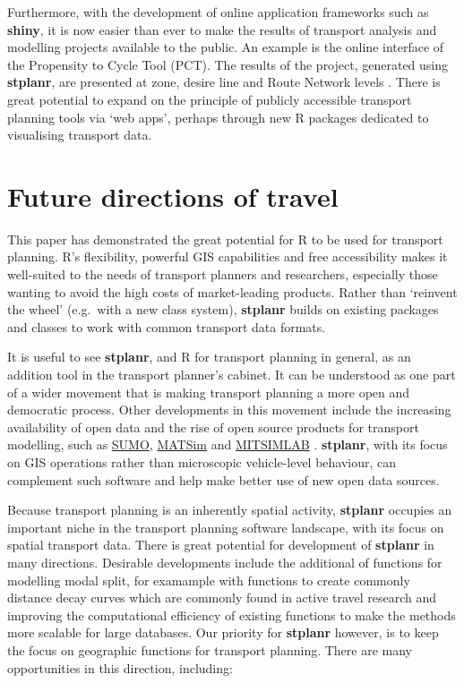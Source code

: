 Furthermore, with the development of online application frameworks such
as \textbf{shiny}, it is now easier than ever to make the results of
transport analysis and modelling projects available to the public. An
example is the online interface of the Propensity to Cycle Tool (PCT).
The results of the project, generated using \textbf{stplanr}, are
presented at zone, desire line and Route Network levels
\citep{lovelace_propensity_2016}. There is great potential to expand on
the principle of publicly accessible transport planning tools via `web
apps', perhaps through new R packages dedicated to visualising transport
data.

\section{Future directions of travel}\label{future-directions-of-travel}

This paper has demonstrated the great potential for R to be used for
transport planning. R's flexibility, powerful GIS capabilities
\citep{bivand_applied_2013} and free accessibility makes it well-suited
to the needs of transport planners and researchers, especially those
wanting to avoid the high costs of market-leading products. Rather than
`reinvent the wheel' (e.g.~with a new class system), \textbf{stplanr}
builds on existing packages and  classes to work with common
transport data formats.

It is useful to see \textbf{stplanr}, and R for transport planning in
general, as an addition tool in the transport planner's cabinet. It can
be understood as one part of a wider movement that is making transport
planning a more open and democratic process. Other developments in this
movement include the increasing availability of open data
\citep{naumova_building_2016} and the rise of open source products for
transport modelling, such as
\href{http://www.dlr.de/ts/en/desktopdefault.aspx/tabid-9883/16931_read-41000/}{SUMO},
\href{http://www.matsim.org/}{MATSim} and
\href{https://its.mit.edu/software/mitsimlab}{MITSIMLAB}
\citep{saidallah_comparative_2016}. \textbf{stplanr}, with its focus on
GIS operations rather than microscopic vehicle-level behaviour, can
complement such software and help make better use of new open data
sources.

Because transport planning is an inherently spatial activity,
\textbf{stplanr} occupies an important niche in the transport planning
software landscape, with its focus on spatial transport data. There is
great potential for development of \textbf{stplanr} in many directions.
Desirable developments include the additional of functions for modelling
modal split, for examample with functions to create commonly distance
decay curves which are commonly found in active travel research
\citep{martinez_new_2013} and improving the computational efficiency of
existing functions to make the methods more scalable for large
databases. Our priority for \textbf{stplanr} however, is to keep the
focus on geographic functions for transport planning. There are many
opportunities in this direction, including:

